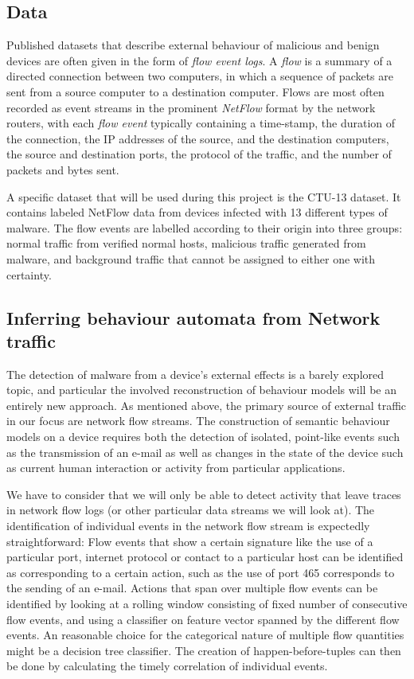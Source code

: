 \documentclass[11pt]{article}
\begin{document}
\subsection{Data}

Published datasets that describe external behaviour of malicious and benign devices are often given in the form of \textit{flow event logs}. A \emph{flow} is a summary of a directed connection between two computers, in which a sequence of packets are sent from a source computer to a destination computer. Flows are most often recorded as event streams in the prominent \emph{NetFlow} format by the network routers, with each \emph{flow event} typically containing a time-stamp, the duration of the connection, the IP addresses of the source, and the destination computers, the source and destination ports, the protocol of the traffic, and the number of packets and bytes sent. 

A specific dataset that will be used during this project is the CTU-13 dataset. It contains labeled NetFlow data from devices infected with 13 different types of malware. The flow events are labelled according to their origin into three groups: normal traffic from verified normal hosts, malicious traffic generated from malware, and background traffic that cannot be assigned to either one with certainty.

\subsection{Inferring behaviour automata from Network traffic}

The detection of malware from a device's external effects is a barely explored topic, and particular the involved reconstruction of behaviour models will be an entirely new approach. As mentioned above, the primary source of external traffic in our focus are network flow streams. The construction of semantic behaviour models on a device requires both the detection of isolated, point-like events such as the transmission of an e-mail as well as changes in the state of the device such as current human interaction or activity from particular applications. 

We have to consider that we will only be able to detect activity that leave traces in network flow logs (or other particular data streams we will look at). 
The identification of individual events in the network flow stream is expectedly straightforward: Flow events that show a certain signature like the use of a particular port, internet protocol or contact to a particular host can be identified as corresponding to a certain action, such as the use of port 465 corresponds to the sending of an e-mail. Actions that span over multiple flow events can be identified by looking at a rolling window consisting of fixed number of consecutive flow events, and using a classifier on feature vector spanned by the different flow events. An reasonable choice for the categorical nature of multiple flow quantities might be a decision tree classifier. The creation of happen-before-tuples can then be done by calculating the timely correlation of individual events.
\end{document}

